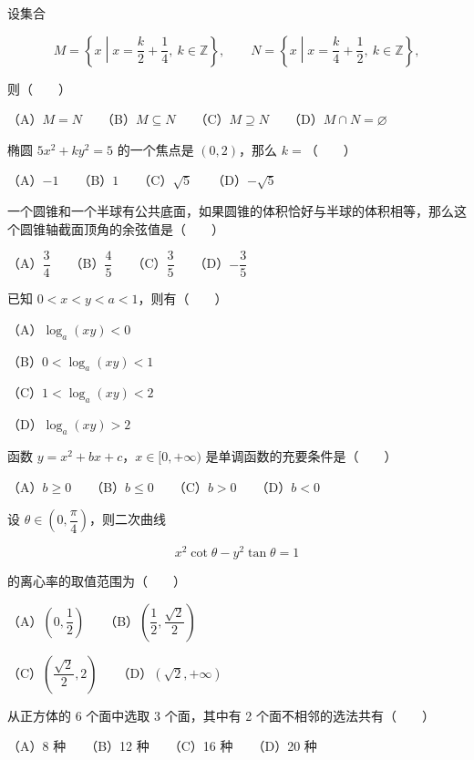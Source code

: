 \begin{question}
设集合

\nopagebreak[4]
\[
M=\left\{x\middle|x=\frac{k}{2}+\frac14,\ k\in\mathbb Z\right\},\qquad
N=\left\{x\middle|x=\frac{k}{4}+\frac12,\ k\in\mathbb Z\right\},
\]

则\mbox{（　　）}

（A）$M=N$　　（B）$M\subseteq N$　　（C）$M\supseteq N$　　（D）$M\cap N=\varnothing$

\end{question}
\begin{question}
椭圆 $5x^2+ky^2=5$ 的一个焦点是 $(0,2)$，那么 $k=$\mbox{（　　）}

（A）$-1$　　（B）$1$　　（C）$\sqrt5$　　（D）$-\sqrt5$

\end{question}
\begin{question}
一个圆锥和一个半球有公共底面，如果圆锥的体积恰好与半球的体积相等，那么这个圆锥轴截面顶角的余弦值是\mbox{（　　）}

（A）$\dfrac34$　　（B）$\dfrac45$　　（C）$\dfrac35$　　（D）$-\dfrac35$

\end{question}
\begin{question}
已知 $0<x<y<a<1$，则有\mbox{（　　）}

（A）$\log_a(xy)<0$

（B）$0<\log_a(xy)<1$

（C）$1<\log_a(xy)<2$

（D）$\log_a(xy)>2$

\end{question}
\begin{question}
函数 $y=x^2+bx+c$，$x\in[0,+\infty)$ 是单调函数的充要条件是\mbox{（　　）}

（A）$b\geqslant0$　　（B）$b\leqslant0$　　（C）$b>0$　　（D）$b<0$

\end{question}
\begin{question}
设 $\theta\in\left(0,\dfrac\pi4\right)$，则二次曲线

\nopagebreak[4]
\[
x^2\cot\theta-y^2\tan\theta=1
\]

的离心率的取值范围为\mbox{（　　）}

（A）$\left(0,\dfrac12\right)$　　（B）$\left(\dfrac12,\dfrac{\sqrt2}{2}\right)$

（C）$\left(\dfrac{\sqrt2}{2},2\right)$　　（D）$(\sqrt2,+\infty)$

\end{question}
\begin{question}
从正方体的 6 个面中选取 3 个面，其中有 2 个面不相邻的选法共有\mbox{（　　）}

（A）8 种　　（B）12 种　　（C）16 种　　（D）20 种

\end{question}

